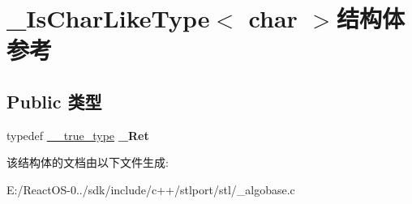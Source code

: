 \hypertarget{struct___is_char_like_type_3_01char_01_4}{}\section{\+\_\+\+Is\+Char\+Like\+Type$<$ char $>$结构体 参考}
\label{struct___is_char_like_type_3_01char_01_4}
\subsection*{Public 类型}
\begin{DoxyCompactItemize}
\item 
\mbox{\label{struct___is_char_like_type_3_01char_01_4_ad22b9f094bea74f9b398365ff0101435}} 
typedef \hyperlink{struct____true__type}{\+\_\+\+\_\+true\+\_\+type} {\bfseries \+\_\+\+Ret}
\end{DoxyCompactItemize}


该结构体的文档由以下文件生成\+:\begin{DoxyCompactItemize}
\item 
E\+:/\+React\+O\+S-\/0../sdk/include/c++/stlport/stl/\+\_\+algobase.\+c\end{DoxyCompactItemize}
